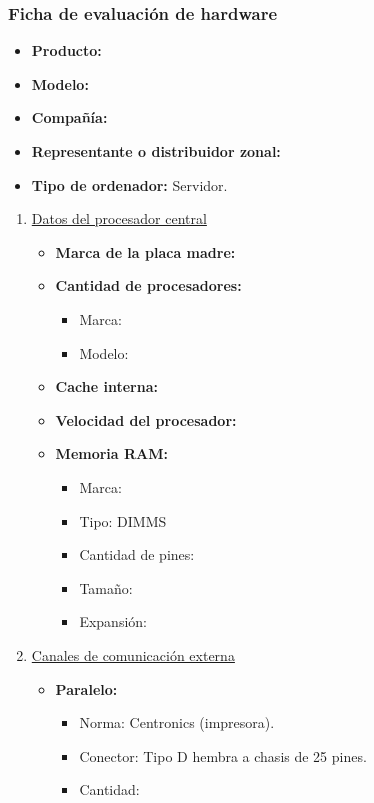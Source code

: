 \subsubsection{Ficha de evaluación de hardware}
\begin{itemize}
  \item \textbf{Producto:}
  \item \textbf{Modelo:}
  \item \textbf{Compañía:}
  \item \textbf{Representante o distribuidor zonal:}
  \item \textbf{Tipo de ordenador:} Servidor.
\end{itemize}

\begin{enumerate}

  \item \underline{Datos del procesador central}
  \begin{itemize}
    \item \textbf{Marca de la placa madre:}
    
    \item \textbf{Cantidad de procesadores:}
    \begin{itemize}
      \item Marca:
      \item Modelo:
    \end{itemize}
    
    \item \textbf{Cache interna:}
    \item \textbf{Velocidad del procesador:}
    \item \textbf{Memoria RAM:}
    
    \begin{itemize}
      \item Marca:
      \item Tipo: DIMMS
      \item Cantidad de pines:
      \item Tamaño:
      \item Expansión:
    \end{itemize}
  \end{itemize}
  
  
  \item \underline{Canales de comunicación externa}
  \begin{itemize}
    \item \textbf{Paralelo:}
    \begin{itemize}
      \item Norma: Centronics (impresora).
      \item Conector: Tipo D hembra a chasis de 25 pines.
      \item Cantidad:
    \end{itemize}
    

\end{itemize}
\end{enumerate}
